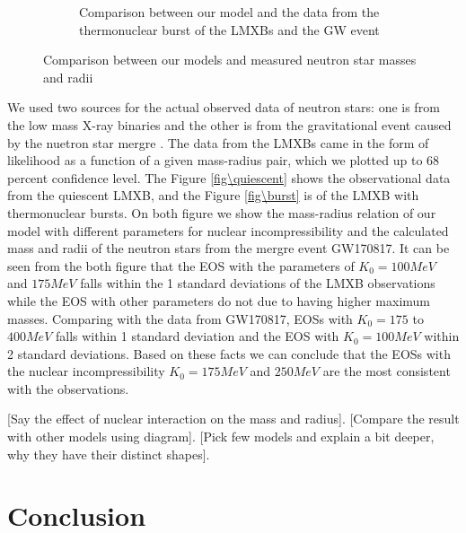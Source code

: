 \documentclass[draft,11pt]{article}
\theoremstyle{definition}
\theoremstyle{remark}
\begin{document}
\begin{figure}[h]
\begin{center}
\begin{subfigure}[b]{.49\textwidth}
                    \caption{Comparison between our model and the data from the thermonuclear burst of the LMXBs and the GW event}\label{fig/burst_LMXB}
                \end{subfigure}
                \caption{Comparison between our models and measured neutron star masses and radii}
            \end{center}\end{figure}
            
                We used two sources for the actual observed data of neutron stars: one is from the low mass X-ray binaries \parencite{ozel.psaltis.2016/radius.oberve} and the other is from the gravitational event caused by the nuetron star mergre \cite{ligo.virgo.2019/prop.of.ns.merger.GW170817,ligo.virgo.2018/GW170817.ns.radii}. The data from the LMXBs came in the form of likelihood as a function of a given mass-radius pair, which we plotted up to 68 percent confidence level. The Figure \ref{fig\quiescent} shows the observational data from the quiescent LMXB, and the Figure \ref{fig\burst} is of the LMXB with thermonuclear bursts. On both figure we show the mass-radius relation of our model with different parameters for nuclear incompressibility and the calculated mass and radii of the neutron stars from the mergre event GW170817. It can be seen from the both figure that the EOS with the parameters of $K_0=100MeV$ and $175MeV$ falls within the 1 standard deviations of the LMXB observations while the EOS with other parameters do not due to having higher maximum masses. Comparing with the data from GW170817, EOSs with $K_0=175$ to $400MeV$ falls within 1 standard deviation and the EOS with $K_0=100MeV$ within 2 standard deviations. Based on these facts we can conclude that the EOSs with the nuclear incompressibility $K_0=175MeV$ and $250MeV$ are the most consistent with the observations.
        
        [Say the effect of nuclear interaction on the mass and radius]. [Compare the result with other models using diagram]. [Pick few models and explain a bit deeper, why they have their distinct shapes].
    
    \section{Conclusion}
    
    \printbibliography
\end{document}

